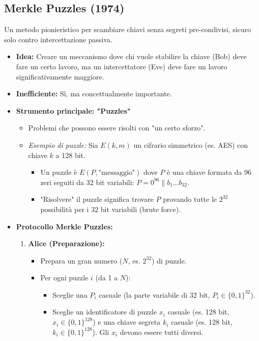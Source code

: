 \subsection{Merkle Puzzles (1974)}
Un metodo pionieristico per scambiare chiavi senza segreti pre-condivisi, sicuro solo contro intercettazione passiva.
\begin{itemize}
    \item \textbf{Idea:} Creare un meccanismo dove chi vuole stabilire la chiave (Bob) deve fare un certo lavoro, ma un intercettatore (Eve) deve fare un lavoro significativamente maggiore.
    \item \textbf{Inefficiente:} Sì, ma concettualmente importante.
    \item \textbf{Strumento principale: "Puzzles"}
        \begin{itemize}
            \item Problemi che possono essere risolti con "un certo sforzo".
            \item \textit{Esempio di puzzle:} Sia $E(k,m)$ un cifrario simmetrico (es. AES) con chiave $k$ a 128 bit.
                \begin{itemize}
                    \item Un puzzle è $E(P, \text{"messaggio"})$ dove $P$ è una chiave formata da 96 zeri seguiti da 32 bit variabili: $P = 0^{96} \parallel b_1 \dots b_{32}$.
                    \item "Risolvere" il puzzle significa trovare $P$ provando tutte le $2^{32}$ possibilità per i 32 bit variabili (brute force).
                \end{itemize}
        \end{itemize}
    \item \textbf{Protocollo Merkle Puzzles:}
        \begin{enumerate}
            \item \textbf{Alice (Preparazione):}
                \begin{itemize}
                    \item Prepara un gran numero ($N$, es. $2^{32}$) di puzzle.
                    \item Per ogni puzzle $i$ (da 1 a $N$):
                        \begin{itemize}
                            \item Sceglie una $P_i$ casuale (la parte variabile di 32 bit, $P_i \in \{0,1\}^{32}$).
                            \item Sceglie un identificatore di puzzle $x_i$ casuale (es. 128 bit, $x_i \in \{0,1\}^{128}$) e una chiave segreta $k_i$ casuale (es. 128 bit, $k_i \in \{0,1\}^{128}$). Gli $x_i$ devono essere tutti diversi.

\end{itemize}
\end{itemize}
\end{enumerate}
\end{itemize}
